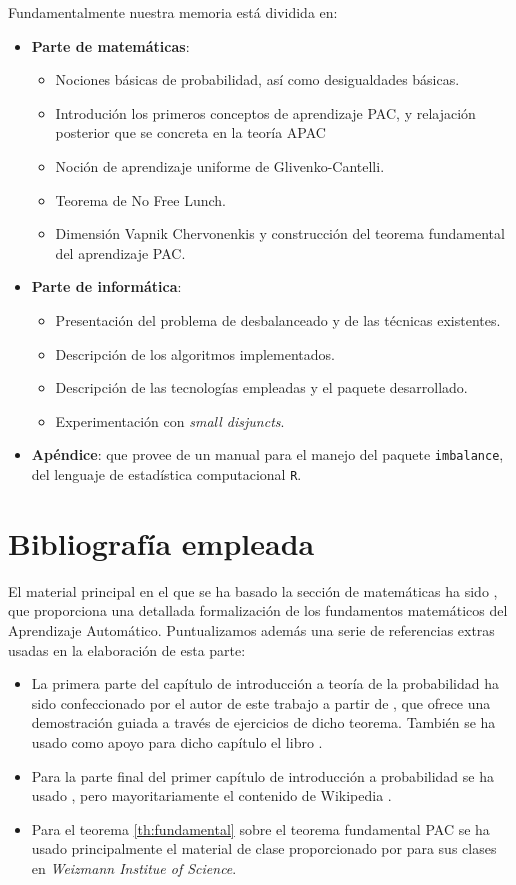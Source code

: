  Fundamentalmente nuestra memoria está dividida en:
 \begin{itemize}
  \item \textbf{Parte de matemáticas}:
   \begin{itemize}
    \item Nociones básicas de probabilidad, así como desigualdades básicas.
    \item Introdución los primeros conceptos de aprendizaje PAC, y relajación posterior que se concreta en la teoría APAC
    \item Noción de aprendizaje uniforme de Glivenko-Cantelli.
    \item Teorema de No Free Lunch.
    \item Dimensión Vapnik Chervonenkis y construcción del teorema fundamental del aprendizaje PAC.
   \end{itemize}
  \item \textbf{Parte de informática}:
   \begin{itemize}
    \item Presentación del problema de desbalanceado y de las técnicas existentes.
    \item Descripción de los algoritmos implementados.
    \item Descripción de las tecnologías empleadas y el paquete desarrollado.
    \item Experimentación con \textit{small disjuncts}.
   \end{itemize}
  \item \textbf{Apéndice}: que provee de un manual para el manejo del paquete \texttt{imbalance}, del lenguaje de estadística
  computacional \texttt{R}.
 \end{itemize}

 
  \section{Bibliografía empleada}
  El material principal en el que se ha basado la sección de matemáticas ha sido \citep{shalev}, 
  que proporciona una detallada formalización de los fundamentos matemáticos del Aprendizaje Automático. Puntualizamos además
  una serie de referencias extras usadas en la elaboración de esta parte:
  
  \begin{itemize} 
   \item La primera parte del capítulo de introducción a teoría de la probabilidad ha sido confeccionado por el autor de 
   este trabajo a partir de \citep{caratheodory}, que ofrece una demostración guiada a través de ejercicios de dicho teorema. 
   También se ha usado como apoyo para dicho capítulo el libro \citep{loeve}. 
   \item Para la parte final del primer capítulo de introducción a probabilidad se ha usado \citep{shalev}, pero
   mayoritariamente el contenido de Wikipedia \citep{wiki:markov, wiki:hoeff_lemma, wiki:hoeffding}.
   \item Para el teorema \ref{th:fundamental} sobre el teorema fundamental PAC se ha usado principalmente el material de clase
   proporcionado por \citep{slfetaya} para sus clases en \textit{Weizmann Institue of Science}.
  \end{itemize}
   
